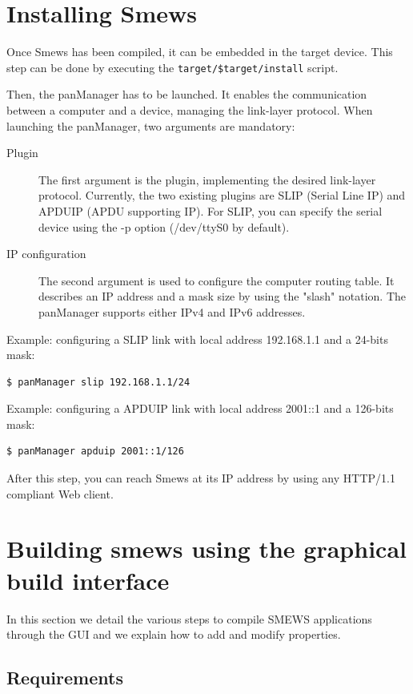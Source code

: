 \documentclass{report}
\begin{document}
\section{Installing Smews}
\label{sec:install}

Once Smews has been compiled, it can be embedded in the target device. This step can be done by executing the \verb+target/$target/install+ script.

Then, the panManager has to be launched. It enables the communication between a computer and a device, managing the link-layer protocol. When launching the panManager, two arguments are mandatory:

\begin{description}
\item[Plugin] The first argument is the plugin, implementing the desired link-layer protocol. Currently, the two existing plugins are SLIP (Serial Line IP) and APDUIP (APDU supporting IP). For SLIP, you can specify the serial device using the -p option (/dev/ttyS0 by default). 
\item[IP configuration] The second argument is used to configure the computer routing table. It describes an IP address and a mask size by using the "slash" notation. The panManager supports either IPv4 and IPv6 addresses.
\end{description}

Example: configuring a SLIP link with local address 192.168.1.1 and a 24-bits mask:
\begin{verbatim}
$ panManager slip 192.168.1.1/24
\end{verbatim}

Example: configuring a APDUIP link with local address 2001::1 and a 126-bits mask:
\begin{verbatim}
$ panManager apduip 2001::1/126
\end{verbatim}

After this step, you can reach Smews at its IP address by using any HTTP/1.1 compliant Web client.

\section{Building smews using the graphical build interface}
\label{sec:gui}

In this section we detail the various steps to compile SMEWS applications
through the GUI and we explain how to add and modify properties.

\subsection{Requirements}
\end{document}
